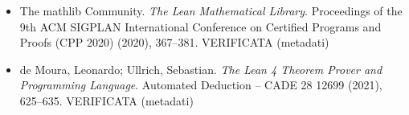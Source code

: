 \begin{itemize}[itemsep=2pt,leftmargin=1.2em,font=\small]
\item {The mathlib Community}. \emph{The {L}ean Mathematical Library}. Proceedings of the 9th ACM SIGPLAN International Conference on Certified Programs and Proofs (CPP 2020) (2020), 367--381. \textsf{\footnotesize VERIFICATA (metadati)}
\item de Moura, Leonardo; Ullrich, Sebastian. \emph{The {L}ean 4 Theorem Prover and Programming Language}. Automated Deduction -- CADE 28 12699 (2021), 625--635. \textsf{\footnotesize VERIFICATA (metadati)}
\end{itemize}
